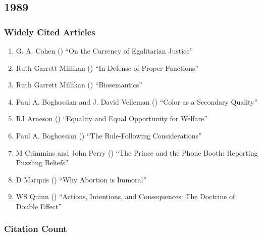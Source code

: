 \documentclass[
  10pt,
  letterpaper,
  DIV=11,
  numbers=noendperiod,
  twoside]{scrartcl}
\providecommand{\tightlist}{%
  \setlength{\itemsep}{0pt}\setlength{\parskip}{0pt}}\usepackage{longtable,booktabs,array}
\begin{document}
\newpage

\subsection{1989}\label{sec-s1989}

\subsubsection*{Widely Cited Articles}\label{widely-cited-articles-32}

\begin{enumerate}
\def\labelenumi{\arabic{enumi}.}
\tightlist
\item
  G. A. Cohen () ``On the
  Currency of Egalitarian Justice''
\item
  Ruth Garrett Millikan () ``In
  Defense of Proper Functions''
\item
  Ruth Garrett Millikan ()
  ``Biosemantics''
\item
  Paul A. Boghossian and J. David Velleman
  () ``Color as a Secondary
  Quality''
\item
  RJ Arneson () ``Equality and
  Equal Opportunity for Welfare''
\item
  Paul A. Boghossian () ``The
  Rule-Following Considerations''
\item
  M Crimmins and John Perry ()
  ``The Prince and the Phone Booth: Reporting Puzzling Beliefs''
\item
  D Marquis () ``Why Abortion is
  Immoral''
\item
  WS Quinn () ``Actions,
  Intentions, and Consequences: The Doctrine of Double Effect''
\end{enumerate}

\subsubsection*{Citation Count}\label{sec-count-1989}
\end{document}
